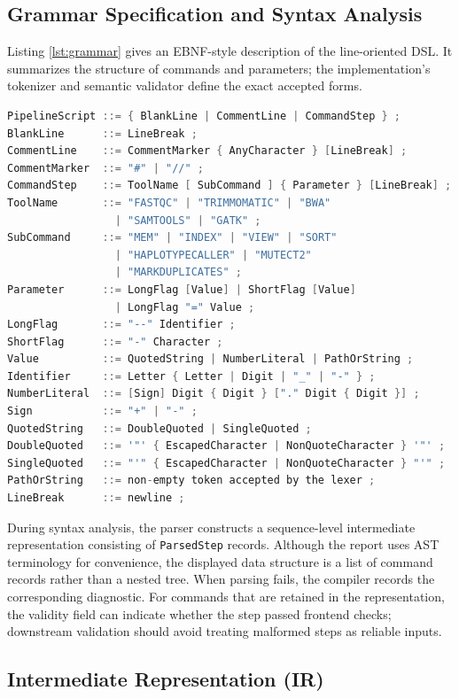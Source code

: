 \documentclass[12pt,a4paper]{article}
\begin{document}
\subsection{Grammar Specification and Syntax Analysis}

Listing \ref{lst:grammar} gives an EBNF-style description of the line-oriented DSL. It summarizes the structure of commands and parameters; the implementation's tokenizer and semantic validator define the exact accepted forms.

\begin{lstlisting}[language=C, caption={EBNF-style description of the line-oriented Genomic Pipeline DSL.}, label={lst:grammar}]
PipelineScript ::= { BlankLine | CommentLine | CommandStep } ;
BlankLine      ::= LineBreak ;
CommentLine    ::= CommentMarker { AnyCharacter } [LineBreak] ;
CommentMarker  ::= "#" | "//" ;
CommandStep    ::= ToolName [ SubCommand ] { Parameter } [LineBreak] ;
ToolName       ::= "FASTQC" | "TRIMMOMATIC" | "BWA"
                 | "SAMTOOLS" | "GATK" ;
SubCommand     ::= "MEM" | "INDEX" | "VIEW" | "SORT"
                 | "HAPLOTYPECALLER" | "MUTECT2"
                 | "MARKDUPLICATES" ;
Parameter      ::= LongFlag [Value] | ShortFlag [Value]
                 | LongFlag "=" Value ;
LongFlag       ::= "--" Identifier ;
ShortFlag      ::= "-" Character ;
Value          ::= QuotedString | NumberLiteral | PathOrString ;
Identifier     ::= Letter { Letter | Digit | "_" | "-" } ;
NumberLiteral  ::= [Sign] Digit { Digit } ["." Digit { Digit }] ;
Sign           ::= "+" | "-" ;
QuotedString   ::= DoubleQuoted | SingleQuoted ;
DoubleQuoted   ::= '"' { EscapedCharacter | NonQuoteCharacter } '"' ;
SingleQuoted   ::= "'" { EscapedCharacter | NonQuoteCharacter } "'" ;
PathOrString   ::= non-empty token accepted by the lexer ;
LineBreak      ::= newline ;
\end{lstlisting}

During syntax analysis, the parser constructs a sequence-level intermediate representation consisting of \texttt{ParsedStep} records. Although the report uses AST terminology for convenience, the displayed data structure is a list of command records rather than a nested tree. When parsing fails, the compiler records the corresponding diagnostic. For commands that are retained in the representation, the validity field can indicate whether the step passed frontend checks; downstream validation should avoid treating malformed steps as reliable inputs.

\subsection{Intermediate Representation (IR)}
\end{document}
